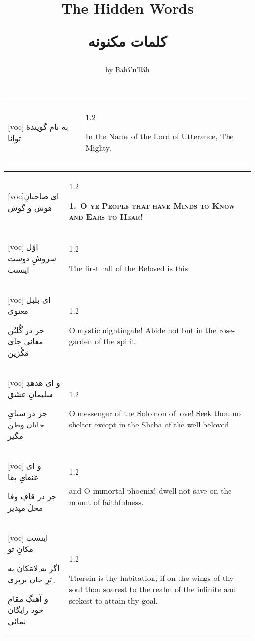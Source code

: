 \documentclass[11pt]{article}
\title{
\Huge
\vspace*{2in}
The Hidden Words \\
\vspace{.25in}
\fontsize{48}{36}
\begin{arab}
کلمات مکنونه
\end{arab}
\vspace{1in}}
\author{\LARGE by Bahá’u’lláh}
\date{}
\makeatletter
\newenvironment{orig}
  {\begin{farsi}[voc]}
  {\end{farsi}}
\newenvironment{trans}
  {\Large\begin{spacing}{1.2}\raggedright}
  {\end{spacing}}
\newenvironment{word}
  {\begin{tabular}[t]{p{2.75in}@{\hspace{3em}}p{2.875in}}}
  {\end{tabular}}
\newcommand{\ayat}[2]{\begin{orig}#1\end{orig} & \begin{trans}#2\end{trans}}
\newcommand{\heading}[2]{\textsc{\textbf{#1}} %
}
\makeatother
\begin{document}
\maketitle
\thispagestyle{empty}

\newpage

\fontsize{24}{32}

\vspace*{3in}

\begin{word}
\ayat{
به نام گویندۀ توانا
}{
In the Name of the Lord of Utterance, The Mighty.
}
\end{word}

\pagebreak

\begin{word}
\ayat{ای صاحبانِ هوش و گوش}{\heading{1.~O ye People that have Minds to Know and Ears to Hear!}{}} \\ \ayat{
اوّل سروشِ دوست اینست
}{The first call of the Beloved is this:} \vspace{-1ex}\\ \ayat{
ای بلبلِ معنوی

جز در گُلبُنِ معانی جای مَگُزين
}{O mystic nightingale! Abide not but in the rose-garden of the spirit.} \\ \ayat{
و ای هدهدِ سلیمانِ عشق

جز در سبایِ جانان وطن مگیر
}{O messenger of the Solomon of love! Seek thou no shelter except in the Sheba
  of the well-beloved,} \vspace{-1ex}\\ \ayat{
و ای عَنقایِ بقا

جز در قافِ وفا محلّ مپذیر
}{and O immortal phoenix! dwell not save on the mount of faithfulness.} \\ \ayat{
اینست مکانِ تو

اگر به ِلامَکان به ِپَرِ جان برپری

و آهنگِ مقامِ خود رایگان نمائی
}{Therein is thy habitation, if on the wings of thy soul thou soarest to the
  realm of the infinite and seekest to attain thy goal.}
\end{word}

\newpage
\end{document}
